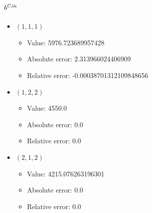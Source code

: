 \documentclass{article}%
\begin{document}
\subsection{$b^{\textsl{C},\text{in}}$}%
\begin{itemize}%
	\item $(1, 1, 1)$%
	\begin{itemize}%
		\item Value: 5976.723689957428%
		\item Absolute error: 2.313966024406909%
		\item Relative error: -0.00038701312109848656%
	\end{itemize}%
	\item $(1, 2, 2)$%
	\begin{itemize}%
		\item Value: 4550.0%
		\item Absolute error: 0.0%
		\item Relative error: 0.0%
	\end{itemize}%
	\item $(2, 1, 2)$%
	\begin{itemize}%
		\item Value: 4215.076263196301%
		\item Absolute error: 0.0%
		\item Relative error: 0.0%
	\end{itemize}%
\end{itemize}%
\end{document}
